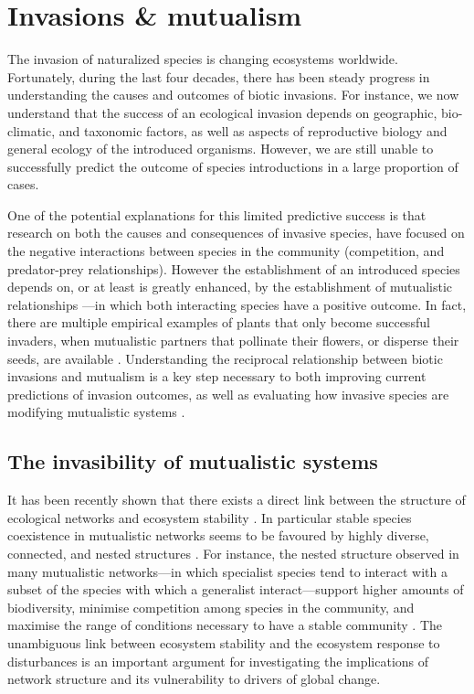 \documentclass[a4paper]{article}
\begin{document}
\section{Invasions \& mutualism}

The invasion of naturalized species is changing ecosystems worldwide.
Fortunately, during the last four decades, there has been steady progress in understanding the causes and outcomes of biotic invasions.
For instance, we now understand that the success of an ecological invasion depends on geographic, bio-climatic, and taxonomic factors, as well as aspects of reproductive biology and general ecology of the introduced organisms.
However, we are still unable to successfully predict the outcome of species introductions in a large proportion of cases.

One of the potential explanations for this limited predictive success is that research on both the causes and consequences of invasive species, have focused on the negative interactions between species in the community (competition, and predator-prey relationships).
However the establishment of an introduced species depends on, or at least is greatly enhanced, by the establishment of  mutualistic relationships \citep{Richardson2000}---in which both interacting species have a positive outcome.
In fact, there are multiple empirical examples of plants that only become successful invaders, when mutualistic partners that pollinate their flowers, or disperse their seeds, are available \citep{Simberloff1999, Simberloff2006, Prior2014}.
Understanding the reciprocal relationship between biotic invasions and mutualism is a key step necessary to both improving current predictions of invasion outcomes, as well as evaluating how invasive species are modifying mutualistic systems \citep{Richardson2000}.

\subsection*{The invasibility of mutualistic systems}

It has been recently shown that there exists a direct link between the structure of ecological networks and ecosystem stability \citep{Bascompte2006,Rooney2006,Okuyama2008,Bastolla2009, Tylianakis2010, Thebault2010,Rohr2014,Sauve2014}.
In particular stable species coexistence in mutualistic networks seems to be favoured by highly diverse, connected, and nested structures \citep{Okuyama2008, Bastolla2009, Thebault2010, Sauve2014}.
For instance, the nested structure observed in many mutualistic networks---in which specialist species tend to interact with a subset of the species with which a generalist interact---support higher amounts of biodiversity, minimise competition among species in the community, and maximise the range of conditions necessary to have a stable community \citep{Bastolla2009, Rohr2014}.
The unambiguous link between ecosystem stability and the ecosystem response to disturbances is an important argument for investigating the implications of network structure and its vulnerability to drivers of global change.
\end{document}
